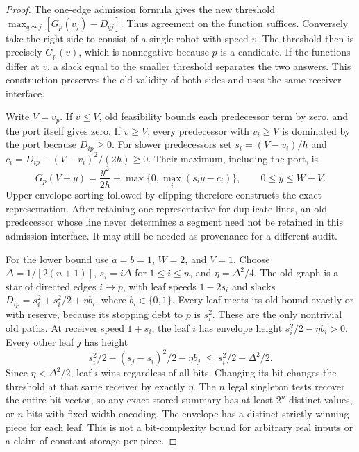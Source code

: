 \documentclass[11pt]{article}
\begin{document}
\begin{proof}
The one-edge admission formula gives the new threshold $\max_{q\leadsto j}[G_p(v_j)-D_{qj}]$. Thus agreement on the function suffices. Conversely take the right side to consist of a single robot with speed $v$. The threshold then is precisely $G_p(v)$, which is nonnegative because $p$ is a candidate. If the functions differ at $v$, a slack equal to the smaller threshold separates the two answers. This construction preserves the old validity of both sides and uses the same receiver interface.

Write $V=v_p$. If $v\le V$, old feasibility bounds each predecessor term by zero, and the port itself gives zero. If $v\ge V$, every predecessor with $v_i\ge V$ is dominated by the port because $D_{ip}\ge0$. For slower predecessors set $s_i=(V-v_i)/h$ and $c_i=D_{ip}-(V-v_i)^2/(2h)\ge0$. Their maximum, including the port, is
\[
 G_p(V+y)=\frac{y^2}{2h}+\max\{0,\max_i(s_i y-c_i)\},
 \qquad 0\le y\le W-V .
\]
Upper-envelope sorting followed by clipping therefore constructs the exact representation. After retaining one representative for duplicate lines, an old predecessor whose line never determines a segment need not be retained in this admission interface. It may still be needed as provenance for a different audit.

For the lower bound use $a=b=1$, $W=2$, and $V=1$. Choose $\Delta=1/[2(n+1)]$, $s_i=i\Delta$ for $1\le i\le n$, and $\eta=\Delta^2/4$. The old graph is a star of directed edges $i\to p$, with leaf speeds $1-2s_i$ and slacks $D_{ip}=s_i^2+s_i^2/2+\eta b_i$, where $b_i\in\{0,1\}$. Every leaf meets its old bound exactly or with reserve, because its stopping debt to $p$ is $s_i^2$. These are the only nontrivial old paths. At receiver speed $1+s_i$, the leaf $i$ has envelope height $s_i^2/2-\eta b_i>0$. Every other leaf $j$ has height
\[
 s_i^2/2-(s_j-s_i)^2/2-\eta b_j
 \ \le\ s_i^2/2-\Delta^2/2 .
\]
Since $\eta<\Delta^2/2$, leaf $i$ wins regardless of all bits. Changing its bit changes the threshold at that same receiver by exactly $\eta$. The $n$ legal singleton tests recover the entire bit vector, so any exact stored summary has at least $2^n$ distinct values, or $n$ bits with fixed-width encoding. The envelope has a distinct strictly winning piece for each leaf. This is not a bit-complexity bound for arbitrary real inputs or a claim of constant storage per piece.
\end{proof}
\end{document}
